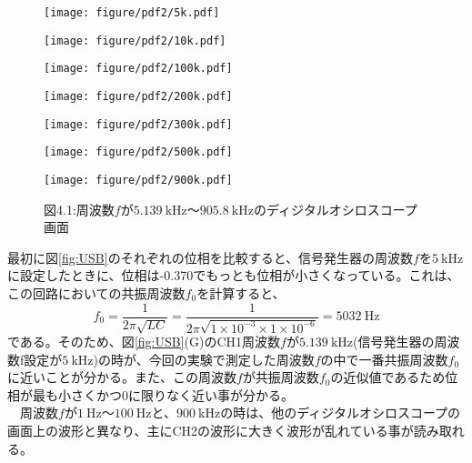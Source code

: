 \documentclass[10pt,a4paper]{jsarticle}
\numberwithin{equation}{section}
\numberwithin{figure}{section}
\numberwithin{table}{section}
\begin{document}
  \begin{figure}[H]
      \begin{minipage}[H]{0.5\linewidth}  
        \centering
        \texttt{[image: figure/pdf2/5k.pdf]}
      \end{minipage}
      \begin{minipage}[H]{0.5\linewidth}  
        \centering
        \texttt{[image: figure/pdf2/10k.pdf]}
      \end{minipage}
      \begin{minipage}[H]{0.5\linewidth}  
        \centering
        \texttt{[image: figure/pdf2/100k.pdf]}
      \end{minipage}
      \begin{minipage}[H]{0.5\linewidth}  
        \centering
        \texttt{[image: figure/pdf2/200k.pdf]}
      \end{minipage}
      \begin{minipage}[H]{0.5\linewidth}  
        \centering
        \texttt{[image: figure/pdf2/300k.pdf]}
      \end{minipage}
      \begin{minipage}[H]{0.5\linewidth}  
        \centering
        \texttt{[image: figure/pdf2/500k.pdf]}
      \end{minipage}
      \begin{minipage}[H]{0.5\linewidth}  
        \centering
        \texttt{[image: figure/pdf2/900k.pdf]}
      \end{minipage}
    \caption*{図4.1:周波数$f$が$\SI{5.139}{\kilo\hertz}$～$\SI{905.8}{\kilo\hertz}$のディジタルオシロスコープ画面}
  \end{figure}
\clearpage
最初に図\ref{fig:USB}のそれぞれの位相を比較すると、信号発生器の周波数$f$を$\SI{5}{\kilo\hertz}$に設定したときに、位相は-0.370でもっとも位相が小さくなっている。これは、この回路においての共振周波数$f_0$を計算すると、
\begin{equation}
  f_0=\dfrac{1}{2\pi\sqrt{LC}}=\dfrac{1}{2\pi\sqrt{1\times 10^{-3}\times 1\times 10^{-6}}}=5032\:\si{\hertz}\label{eq:共振周波数}
\end{equation}
である。そのため、図\ref{fig:USB}(G)のCH1周波数$f$が$\SI{5.139}{\kilo\hertz}$(信号発生器の周波数f設定が$\SI{5}{\kilo\hertz}$)の時が、今回の実験で測定した周波数$f$の中で一番共振周波数$f_0$に近いことが分かる。また、この周波数$f$が共振周波数$f_0$の近似値であるため位相が最も小さくかつ0に限りなく近い事が分かる。\\
　周波数$f$が$\SI{1}{\hertz}$～$\SI{100}{\hertz}$と、$\SI{900}{\kilo\hertz}$の時は、他のディジタルオシロスコープの画面上の波形と異なり、主にCH2の波形に大きく波形が乱れている事が読み取れる。
\end{document}
